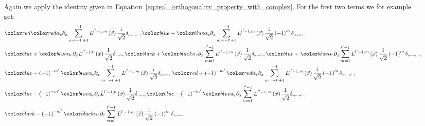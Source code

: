 \documentclass{egpubl}
\makeatletter
\newcommand{\ud}{\,\mathrm{d}} %
\def\mathcolor#1#{\@mathcolor{#1}}
\def\@mathcolor#1#2#3{%
  \protect\leavevmode
  \begingroup\color#1{#2}#3\endgroup
}
\makeatother
\begin{document}
Again we apply the identity given in Equation~\ref{eq:real_orthogonality_property_with_complex}. For the first two terms we for example get:
\begin{align*}
&
\mathcolor{red}{}
\mathcolor{red}{\alpha_c\partial_x
\sum_{m=-l'+1}^{-1}L^{l'-1,m}\left (\vec{x}\right)
\frac{i}{\sqrt{2}}
\delta_{\scaleto{m=-m'-1}{4pt}}
}
\mathcolor{blue}{
-
}
\mathcolor{blue}{
\alpha_c\partial_x
\sum_{m=-l'+1}^{-1}L^{l'-1,m}\left (\vec{x}\right)
\frac{i}{\sqrt{2}}
\left({-1}\right)^{m}
\delta_{\scaleto{m=m'+1}{4pt}}
}
\\&
\mathcolor{blue}
{
+
}
\mathcolor{blue}
{
\alpha_c\partial_x
L^{l'-1,0}\left (\vec{x}\right)
\frac{1}{\sqrt{2}}
\delta_{\scaleto{-m'=1}{4pt}}
}
\mathcolor{black}
{
+
}
\mathcolor{black}
{
\alpha_c\partial_x
\sum_{m=1}^{l'-1}L^{l'-1,m}\left (\vec{x}\right)
\frac{1}{\sqrt{2}}
\delta_{\scaleto{m=m'+1}{4pt}}
}
\mathcolor{blue}
{
+
}
\mathcolor{blue}
{
\alpha_c\partial_x
\sum_{m=1}^{l'-1}L^{l'-1,m}\left (\vec{x}\right)
\frac{1}{\sqrt{2}}
\left({-1}\right)^{m}
\delta_{\scaleto{m=-m'-1}{4pt}}
}
\\&
\mathcolor{blue}
{
-\left({-1}\right)^{-m'}
}
\mathcolor{blue}{
\alpha_c\partial_x
\sum_{m=-l'+1}^{-1}L^{l'-1,m}\left (\vec{x}\right)
\frac{i}{\sqrt{2}}
\delta_{\scaleto{m=m'+1}{4pt}}
}
\mathcolor{red}
{
+\left({-1}\right)^{-m'}
}
\mathcolor{red}
{
\alpha_c\partial_x
\sum_{m=-l'+1}^{-1}L^{l'-1,m}\left (\vec{x}\right)
\frac{i}{\sqrt{2}}
\left({-1}\right)^{m}
\delta_{\scaleto{m=-m'-1}{4pt}}
}
\\&
\mathcolor{blue}
{
-
\left({-1}\right)^{-m'}
}
\mathcolor{blue}
{
\alpha_c\partial_x
L^{l'-1,0}\left (\vec{x}\right)
\frac{1}{\sqrt{2}}
\delta_{\scaleto{-m'=1}{4pt}}
}
\mathcolor{blue}
{
-
\left({-1}\right)^{-m'}
}
\mathcolor{blue}
{
\alpha_c\partial_x
\sum_{m=1}^{l'-1}L^{l'-1,m}\left (\vec{x}\right)
\frac{1}{\sqrt{2}}
\delta_{\scaleto{m=-m'-1}{4pt}}
}
\\&
\mathcolor{black}
{
-
\left({-1}\right)^{-m'}
}
\mathcolor{black}
{
\alpha_c\partial_x
\sum_{m=1}^{l'-1}L^{l'-1,m}\left (\vec{x}\right)
\frac{1}{\sqrt{2}}
\left({-1}\right)^{m}
\delta_{\scaleto{m=m'+1}{4pt}}
}
\end{align*}
\end{document}
